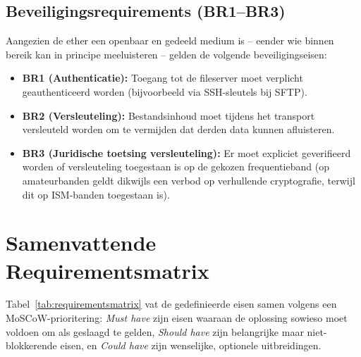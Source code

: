 \subsection{Beveiligingsrequirements (BR1--BR3)}
Aangezien de ether een openbaar en gedeeld medium is -- eender wie binnen bereik kan in principe meeluisteren -- gelden de volgende beveiligingseisen:
\begin{itemize}
  \item \textbf{BR1 (Authenticatie):} Toegang tot de fileserver moet verplicht geauthenticeerd worden (bijvoorbeeld via SSH-sleutels bij SFTP).
  \item \textbf{BR2 (Versleuteling):} Bestandsinhoud moet tijdens het transport versleuteld worden om te vermijden dat derden data kunnen afluisteren.
  \item \textbf{BR3 (Juridische toetsing versleuteling):} Er moet expliciet geverifieerd worden of versleuteling toegestaan is op de gekozen frequentieband (op amateurbanden geldt dikwijls een verbod op verhullende cryptografie, terwijl dit op ISM-banden toegestaan is).
\end{itemize}

\section{Samenvattende Requirementsmatrix}
\label{sec:requirementsmatrix}

Tabel~\ref{tab:requirementsmatrix} vat de gedefinieerde eisen samen volgens een MoSCoW-prioritering: \textit{Must have} zijn eisen waaraan de oplossing sowieso moet voldoen om als geslaagd te gelden, \textit{Should have} zijn belangrijke maar niet-blokkerende eisen, en \textit{Could have} zijn wenselijke, optionele uitbreidingen.

